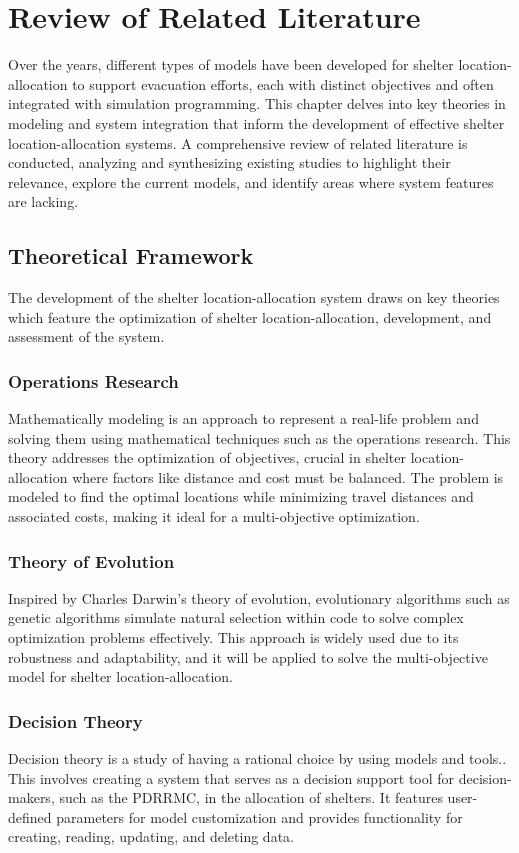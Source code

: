 \chapter{Review of Related Literature}

	Over the years, different types of models have been developed for shelter location-allocation to support evacuation efforts, each with distinct objectives and often integrated with simulation programming. This chapter delves into key theories in modeling and system integration that inform the development of effective shelter location-allocation systems. A comprehensive review of related literature is conducted, analyzing and synthesizing existing studies to highlight their relevance, explore the current models, and identify areas where system features are lacking. 

\section{Theoretical Framework}
	The development of the shelter location-allocation system draws on key theories which feature the optimization of shelter location-allocation, development, and assessment of the system.

\subsection{Operations Research}
 	Mathematically modeling is an approach to represent a real-life problem and solving them using mathematical techniques such as the operations research. This theory addresses the optimization of objectives, crucial in shelter location-allocation where factors like distance and cost must be balanced. The problem is modeled to find the optimal locations while minimizing travel distances and associated costs, making it ideal for a multi-objective optimization.

\subsection{Theory of Evolution}
	Inspired by Charles Darwin’s theory of evolution, evolutionary algorithms such as genetic algorithms simulate natural selection within code to solve complex optimization problems effectively. This approach is widely used due to its robustness and adaptability, and it will be applied to solve the multi-objective model for shelter location-allocation.

\subsection{Decision Theory}
 	Decision theory is a study of having a rational choice by using models and tools.. This involves creating a system that serves as a decision support tool for decision-makers, such as the PDRRMC, in the allocation of shelters. It features user-defined parameters for model customization and provides functionality for creating, reading, updating, and deleting data.

